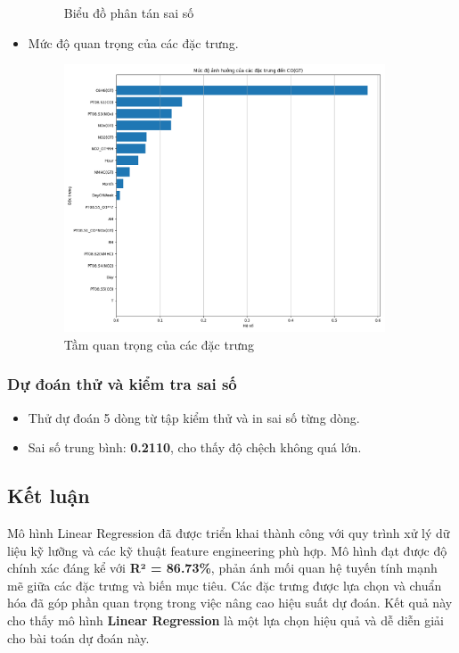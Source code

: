 \begin{itemize}
\begin{figure}[H]
        \caption{Biểu đồ phân tán sai số}
        \label{fig:importance}
    \end{figure}
    \item Mức độ quan trọng của các đặc trưng.
    \begin{figure}[H]
        \centering
        \includegraphics[width=0.9\textwidth]{images/Linear_regression/feature_importance.png}
        \caption{Tầm quan trọng của các đặc trưng}
        \label{fig:importance}
    \end{figure}
\end{itemize}

\subsubsection{Dự đoán thử và kiểm tra sai số}
\begin{itemize}
    \item Thử dự đoán 5 dòng từ tập kiểm thử và in sai số từng dòng.
    \item Sai số trung bình: \textbf{0.2110}, cho thấy độ chệch không quá lớn.
\end{itemize}

\subsection{Kết luận}
Mô hình Linear Regression đã được triển khai thành công với quy trình xử lý dữ liệu kỹ lưỡng và các kỹ thuật feature engineering phù hợp. Mô hình đạt được độ chính xác đáng kể với \textbf{R² = 86.73\%}, phản ánh mối quan hệ tuyến tính mạnh mẽ giữa các đặc trưng và biến mục tiêu. Các đặc trưng được lựa chọn và chuẩn hóa đã góp phần quan trọng trong việc nâng cao hiệu suất dự đoán. Kết quả này cho thấy mô hình\textbf{ Linear Regression} là một lựa chọn hiệu quả và dễ diễn giải cho bài toán dự đoán này.
